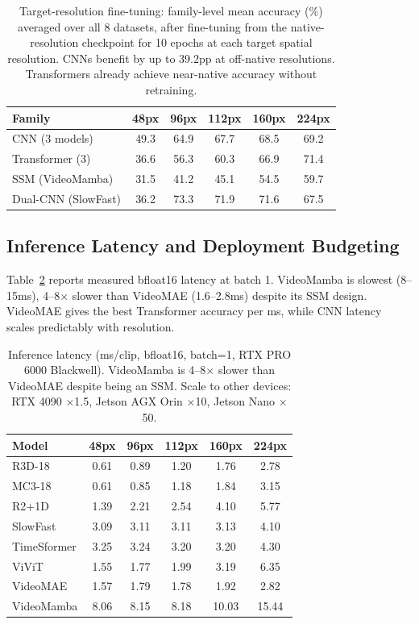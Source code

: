 \documentclass[runningheads]{llncs}
\newcommand{\tabtight}{\setlength{\tabcolsep}{3.5pt}\renewcommand{\arraystretch}{1.10}}
\begin{document}
\begin{table}[t]
\centering
\caption{Target-resolution fine-tuning: family-level mean accuracy (\%) averaged over all 8 datasets, after fine-tuning from the native-resolution checkpoint for 10 epochs at each target spatial resolution. CNNs benefit by up to 39.2pp at off-native resolutions. Transformers already achieve near-native accuracy without retraining.}
\label{tab:p3}
\scriptsize\tabtight
\begin{tabular}{l ccccc}
\toprule
Family & 48px & 96px & 112px & 160px & 224px \\
\midrule
CNN (3 models)  & 49.3 & 64.9 & 67.7 & 68.5 & 69.2 \\
Transformer (3) & 36.6 & 56.3 & 60.3 & 66.9 & 71.4 \\
SSM (VideoMamba) & 31.5 & 41.2 & 45.1 & 54.5 & 59.7 \\
Dual-CNN (SlowFast) & 36.2 & 73.3 & 71.9 & 71.6 & 67.5 \\
\bottomrule
\end{tabular}
\end{table}

\subsection{Inference Latency and Deployment Budgeting}
\label{sec:results_latency}

Table~\ref{tab:latency} reports measured bfloat16 latency at batch 1. VideoMamba is slowest (8--15ms), 4--8$\times$ slower than VideoMAE (1.6--2.8ms) despite its SSM design. VideoMAE gives the best Transformer accuracy per ms, while CNN latency scales predictably with resolution.

\begin{table}[t]
\centering
\caption{Inference latency (ms/clip, bfloat16, batch=1, RTX PRO 6000 Blackwell). VideoMamba is 4--8$\times$ slower than VideoMAE despite being an SSM. Scale to other devices: RTX 4090 $\times$1.5, Jetson AGX Orin $\times$10, Jetson Nano $\times$50.}
\label{tab:latency}
\scriptsize\tabtight
\begin{tabular}{l ccccc}
\toprule
Model & 48px & 96px & 112px & 160px & 224px \\
\midrule
R3D-18      & 0.61 & 0.89 & 1.20 & 1.76 & 2.78 \\
MC3-18      & 0.61 & 0.85 & 1.18 & 1.84 & 3.15 \\
R2+1D       & 1.39 & 2.21 & 2.54 & 4.10 & 5.77 \\
SlowFast    & 3.09 & 3.11 & 3.11 & 3.13 & 4.10 \\
\midrule
TimeSformer & 3.25 & 3.24 & 3.20 & 3.20 & 4.30 \\
ViViT       & 1.55 & 1.77 & 1.99 & 3.19 & 6.35 \\
VideoMAE    & 1.57 & 1.79 & 1.78 & 1.92 & 2.82 \\
VideoMamba  & 8.06 & 8.15 & 8.18 & 10.03 & 15.44 \\
\bottomrule
\end{tabular}
\end{table}
\end{document}
